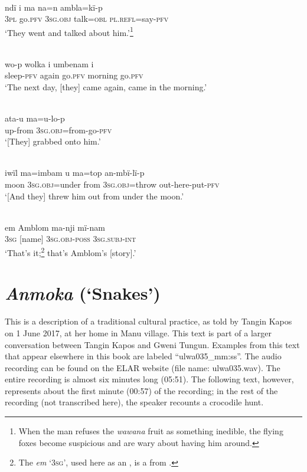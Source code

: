 \\
\gll ndï  i    ma      na=n    ambla=kï-p\\
3\textsc{pl}  go.\textsc{pfv}  3\textsc{sg.obj}  talk=\textsc{obl}  \textsc{pl.refl}=say-\textsc{pfv}\\
\glt ‘They went and talked about him.’\footnote{When the man refuses the \textit{wawana} fruit as something inedible, the flying foxes become suspicious and are wary about having him around.}

\\
\gll wo-p    wolka  i    umbenam  i\\
sleep-\textsc{pfv}  again  go.\textsc{pfv}  morning  go.\textsc{pfv}\\
\glt ‘The next day, [they] came again, came in the morning.’

\\
\gll ata-u    ma=u-lo-p\\
up-from  3\textsc{sg.obj}=from-go-\textsc{pfv}\\
\glt ‘[They] grabbed onto him.’

\\
\gll iwïl  ma=imbam    u    ma=top      an-mbï-lï-p\\
moon  3\textsc{sg.obj}=under  from  3\textsc{sg.obj}=throw  out-here-put-\textsc{pfv}\\
\glt ‘[And they] threw him out from under the moon.’

\\
\gll em    Amblom  ma-nji    mï-nam\\
3\textsc{sg}  [name]    3\textsc{sg.obj-poss}  3\textsc{sg.subj-int}\\
\glt ‘That’s it;\footnote{The  \textit{em} ‘3\textsc{sg}’, used here as an , is a  from .} that’s Amblom’s [story].’
\z

\section{\label{sec:16.3}  {\textit{Anmoka}} {(‘Snakes’)}}

This is a description of a traditional cultural practice, as told by Tangin Kapos on 1 {June 2017}, at her home in Manu village. This text is part of a larger conversation between Tangin Kapos and Gweni Tungun. Examples from this text that appear elsewhere in this book are labeled “ulwa035\_mm:ss”. The audio recording can be found on the ELAR website (file name: ulwa035.wav). The entire recording is almost six minutes long (05:51). The following text, however, represents about the first minute (00:57) of the recording; in the rest of the recording (not transcribed here), the speaker recounts a crocodile hunt.

